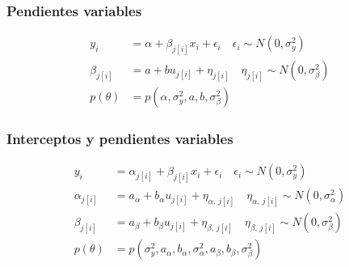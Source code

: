 \subsubsection*{Pendientes variables}
\begin{align*}
y_i &= \alpha + \beta_{j[i]} x_i + \epsilon_i  \quad \epsilon_i  \sim N(0,\sigma_y^2) \\
\beta_{j[i]} &= a + b u_{j[i]} + \eta_{j[i]} \quad \eta_{j[i]} \sim N(0, \sigma_{\beta}^2) \\ 
p(\theta) &= p(\alpha,\sigma_y^2,a,b,\sigma_{\beta}^2)
\end{align*}

\subsubsection*{Interceptos y pendientes variables}
\begin{align*}
y_i &= \alpha_{j[i]} + \beta_{j[i]} x_i + \epsilon_i  \quad \epsilon_i  \sim N(0,\sigma_y^2) \\
\alpha_{j[i]} &= a_{\alpha} + b_{\alpha} u_{j[i]} + \eta_{\alpha,\,j[i]} \quad \eta_{\alpha,\,j[i]}  \sim N(0, \sigma_{\alpha}^2) \\ 
\beta_{j[i]} &= a_{\beta} + b_{\beta} u_{j[i]} + \eta_{\beta,\,j[i]} \quad \eta_{\beta,\,j[i]}  \sim N(0, \sigma_{\beta}^2) \\ 
p(\theta) &= p(\sigma_y^2,a_{\alpha},b_{\alpha},\sigma_{\alpha}^2,a_{\beta},b_{\beta},\sigma_{\beta}^2)
\end{align*}
